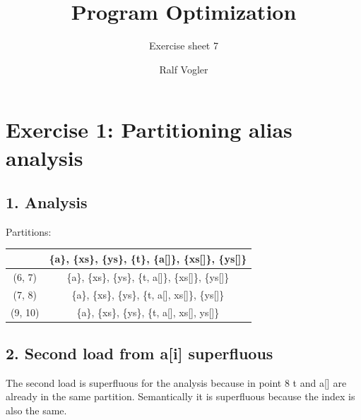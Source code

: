\documentclass[11pt,a4paper]{scrartcl}
\begin{document}
\author{Ralf Vogler}
\title{Program Optimization}
\subtitle{Exercise sheet 7}

\maketitle

\section*{Exercise 1: Partitioning alias analysis}
\subsection*{1. Analysis}
Partitions:\\
\begin{tabular}{|c|c|}
\hline
 & \{a\}, \{xs\}, \{ys\}, \{t\}, \{a[]\}, \{xs[]\}, \{ys[]\}\\
\hline
(6, 7) & \{a\}, \{xs\}, \{ys\}, \{t, a[]\}, \{xs[]\}, \{ys[]\} \\
(7, 8) & \{a\}, \{xs\}, \{ys\}, \{t, a[], xs[]\}, \{ys[]\} \\
(9, 10) & \{a\}, \{xs\}, \{ys\}, \{t, a[], xs[], ys[]\} \\
\hline
\end{tabular}

\subsection*{2. Second load from a[i] superfluous}
The second load is superfluous for the analysis because in point 8 t and a[] are already in the same partition.
Semantically it is superfluous because the index is also the same.
\end{document}
